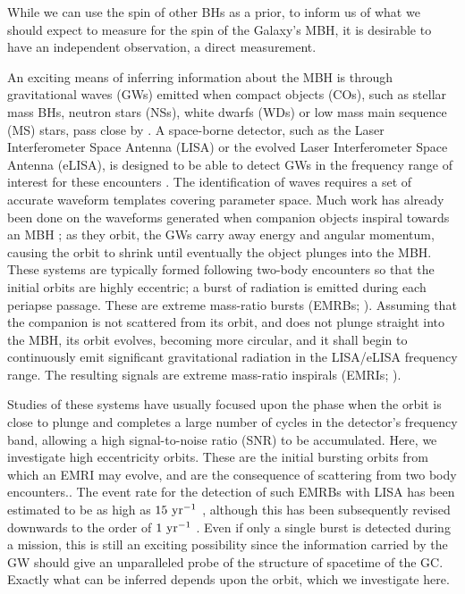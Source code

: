 While we can use the spin of other BHs as a prior, to inform us of what we should expect to measure for the spin of the Galaxy's MBH, it is desirable to have an independent observation, a direct measurement.

An exciting means of inferring information about the MBH is through gravitational waves (GWs) emitted when compact objects (COs), such as stellar mass BHs, neutron stars (NSs), white dwarfs (WDs) or low mass main sequence (MS) stars, pass close by \citep{Sathyaprakash2009}. A space-borne detector, such as the Laser Interferometer Space Antenna (LISA) or the evolved Laser Interferometer Space Antenna (eLISA), is designed to be able to detect GWs in the frequency range of interest for these encounters \citep{Bender1998, Danzmann2003, Jennrich2011, Amaro-Seoane2012a}. The identification of waves requires a set of accurate waveform templates covering parameter space. Much work has already been done on the waveforms generated when companion objects inspiral towards an MBH \citep{Glampedakis2005, Barack2009}; as they orbit, the GWs carry away energy and angular momentum, causing the orbit to shrink until eventually the object plunges into the MBH. These systems are typically formed following two-body encounters so that the initial orbits are highly eccentric; a burst of radiation is emitted during each periapse passage. These are extreme mass-ratio bursts (EMRBs; \citealt{Rubbo2006}). Assuming that the companion is not scattered from its orbit, and does not plunge straight into the MBH, its orbit evolves, becoming more circular, and it shall begin to continuously emit significant gravitational radiation in the LISA/eLISA frequency range. The resulting signals are extreme mass-ratio inspirals (EMRIs; \citealt{Amaro-Seoane2007}).

Studies of these systems have usually focused upon the phase when the orbit is close to plunge and completes a large number of cycles in the detector's frequency band, allowing a high signal-to-noise ratio (SNR) to be accumulated. Here, we investigate high eccentricity orbits. These are the initial bursting orbits from which an EMRI may evolve, and are the consequence of scattering from two body encounters.. The event rate for the detection of such EMRBs with LISA has been estimated to be as high as $15~\mathrm{yr^{-1}}$ \citep{Rubbo2006}, although this has been subsequently revised downwards to the order of $1~\mathrm{yr^{-1}}$ \citep{Hopman2007}. Even if only a single burst is detected during a mission, this is still an exciting possibility since the information carried by the GW should give an unparalleled probe of the structure of spacetime of the GC. Exactly what can be inferred depends upon the orbit, which we investigate here. 

